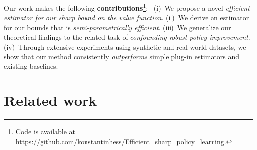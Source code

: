 \documentclass{article} %
\theoremstyle{plain}
\theoremstyle{definition}
\theoremstyle{remark}
\begin{document}

Our work makes the following \textbf{contributions}\footnote{{Code is available at \url{https://github.com/konstantinhess/Efficient_sharp_policy_learning}.}}:
~(i)~We propose a novel \emph{efficient estimator for our sharp bound on the value function}. (ii)~We derive an estimator for our bounds that is \emph{semi-parametrically efficient}. (iii)~We generalize our theoretical findings to the related task of \emph{confounding-robust policy improvement}. (iv)~Through extensive experiments using synthetic and real-world datasets, we show that our method consistently \emph{outperforms} simple plug-in estimators and existing baselines. 


\section{Related work}\label{sec:rw}
\end{document}
